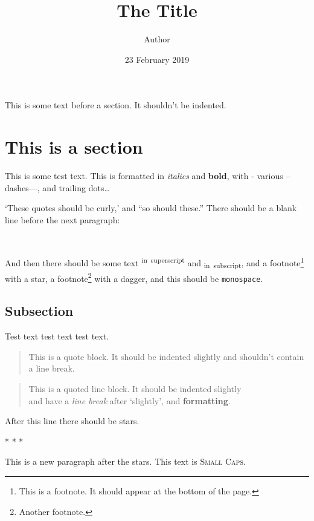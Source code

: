\documentclass[12pt,a4paper,]{article}
\title{The Title}
\author{Author}
\date{23 February 2019}
\newif\iffootnote
\let\Footnote\footnote
\renewcommand\footnote[1]{\begingroup\footnotetrue\Footnote{#1}\endgroup}
\let\OldRule\rule
\renewcommand{\rule}[2]{\iffootnote\OldRule{#1}{#2}\else* * *\fi}
\begin{document}
\maketitle

\frenchspacing

\noindent
This is some text before a section. It shouldn't be indented.

\section{This is a section}\label{this-is-a-section}

This is some test text. This is formatted in \emph{italics} and
\textbf{bold}, with - various -- dashes---, and trailing dots\ldots{}

`These quotes should be curly,' and ``so should these.'' There should be
a blank line before the next paragraph:

~

And then there should be some text \textsuperscript{in~superscript} and
\textsubscript{in~subscript}, and a footnote\footnote{This is a
  footnote. It should appear at the bottom of the page.} with a star, a
footnote\footnote{Another footnote.} with a dagger, and this should be
\texttt{monospace}.

\subsection{Subsection}\label{subsection}

Test text test text test text.

\begin{quote}
This is a quote block. It should be indented slightly and shouldn't
contain a line break.
\end{quote}

\begin{quote}
This is a quoted line block. It should be indented slightly\\
and have a \emph{line break} after `slightly', and \textbf{formatting}.
\end{quote}

After this line there should be stars.

\begin{center}\rule{0.5\linewidth}{\linethickness}\end{center}

This is a new paragraph after the stars. This text is \textsc{Small
Caps}.
\end{document}
